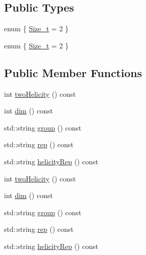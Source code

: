 \subsection*{Public Types}
\begin{DoxyCompactItemize}
\item 
enum \{ \mbox{\hyperlink{structHadron_1_1H3o2C4nnmERep_a73a467969eda0ad3b576bf12b4eb4eecabafec3f3d860668abf17d8cbb6d1899c}{Size\+\_\+t}} = 2
 \}
\item 
enum \{ \mbox{\hyperlink{structHadron_1_1H3o2C4nnmERep_a73a467969eda0ad3b576bf12b4eb4eecabafec3f3d860668abf17d8cbb6d1899c}{Size\+\_\+t}} = 2
 \}
\end{DoxyCompactItemize}
\subsection*{Public Member Functions}
\begin{DoxyCompactItemize}
\item 
int \mbox{\hyperlink{structHadron_1_1H3o2C4nnmERep_a35fd1930d21f1fdc0c007b9d9f95b211}{two\+Helicity}} () const
\item 
int \mbox{\hyperlink{structHadron_1_1H3o2C4nnmERep_a8033496b62e24970283fce0c10203e0c}{dim}} () const
\item 
std\+::string \mbox{\hyperlink{structHadron_1_1H3o2C4nnmERep_a94fc651e597e1a65fb7be16b3b6e8ef9}{group}} () const
\item 
std\+::string \mbox{\hyperlink{structHadron_1_1H3o2C4nnmERep_af384ff99c3d56a172c61764888b2999b}{rep}} () const
\item 
std\+::string \mbox{\hyperlink{structHadron_1_1H3o2C4nnmERep_a4ca04daa91fc608d0c528d0e0eb6a24e}{helicity\+Rep}} () const
\item 
int \mbox{\hyperlink{structHadron_1_1H3o2C4nnmERep_a35fd1930d21f1fdc0c007b9d9f95b211}{two\+Helicity}} () const
\item 
int \mbox{\hyperlink{structHadron_1_1H3o2C4nnmERep_a8033496b62e24970283fce0c10203e0c}{dim}} () const
\item 
std\+::string \mbox{\hyperlink{structHadron_1_1H3o2C4nnmERep_a94fc651e597e1a65fb7be16b3b6e8ef9}{group}} () const
\item 
std\+::string \mbox{\hyperlink{structHadron_1_1H3o2C4nnmERep_af384ff99c3d56a172c61764888b2999b}{rep}} () const
\item 
std\+::string \mbox{\hyperlink{structHadron_1_1H3o2C4nnmERep_a4ca04daa91fc608d0c528d0e0eb6a24e}{helicity\+Rep}} () const
\end{DoxyCompactItemize}



